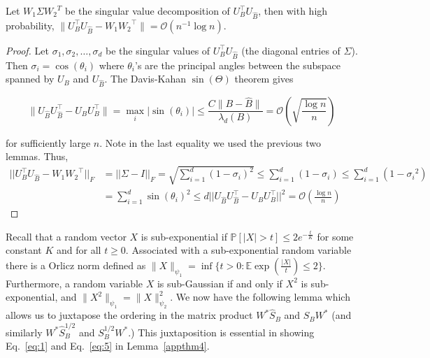 \begin{proposition}
\label{appthm8}
  Let $W_{1} \Sigma {W_2}^{T}$ be the singular value decomposition of $U_B^{\top} U_{\hat{B}}$, then with high probability, $\|U_B^{\top} U_{\hat{B}} - {W_1} {W_2}^\top\| = \mathcal{O}(n^{-1} \log n)$.
\end{proposition}
\begin{proof}
  Let $\sigma_1, \sigma_2, \ldots, \sigma_d$ be the singular values of $U_B^{\top} U_{\hat{B}}$ (the diagonal entries of $\Sigma$). Then  $\sigma_i = \cos(\theta_i)$ where $\theta_i$'s are the principal angles between the subspace spanned by $U_B$ and $U_{\hat{B}}$. The Davis-Kahan $\sin(\Theta)$  theorem \citep{D-K} gives
   
  $$\|U_{\hat{B}} U_{\hat{B}}^{\top} - U_B U_B^{\top}\| = \max\limits_{i} |\sin(\theta_i)| \leq \frac{C \|B - \hat{B}\|}{\lambda_d (B)} = \mathcal{O}(\sqrt {\frac{\log n}{n}})$$ 
  
  for sufficiently large $n$. Note in the last equality we used the previous two lemmas.
  Thus,
  \begin{align*}
    || U_B^{\top} U_{\hat{B}} - W_1 {W_2}^\top||_F
    & = || \Sigma - I ||_F = \sqrt{ \sum\limits_{i=1}^{d} (1- \sigma_i)^2 } \leq \sum\limits_{i=1}^{d} (1- \sigma_i) \leq \sum\limits_{i=1}^{d} (1- {\sigma_i}^2) \\
    &  = \sum\limits_{i=1}^{d} {\sin(\theta_i)}^2 \leq d || U_{\hat{B}} U_{\hat{B}}^{\top} - U_B U_B^{\top}||^{2} = \mathcal{O}(\frac{\log n}{n})
   \end{align*}
\end{proof}

Recall that a random vector $X$ is sub-exponential if $\mathbb{P}[ | X | > t] \leq 2 e^{ -\frac{t}{ {K}} }$ for some constant $K$ and for all $t \geq 0$. Associated with a sub-exponential random variable there is a Orlicz norm defined as $ \| X \|_{\psi_1} = \inf \{ t >0 : \mathbb{E} \exp(\frac{|X| }{t}) \leq 2 \}$. Furthermore, a random variable $X$ is sub-Gaussian if and only if $X^2$ is sub-exponential, and $ \| X^2\|_{\psi_1} = \|X\|_{\psi_2}^2 $. We now have the following lemma which allows us to juxtapose the ordering in the matrix product $W^{*} \hat{S}_B$ and $S_B W^{*}$ (and similarly $W^{*} \hat{S}_B^{1/2}$ and $S_B^{1/2} W^{*}$.) This juxtaposition is essential in showing Eq.~\eqref{eq:1} and Eq.~\eqref{eq:5} in Lemma~\ref{appthm4}. 


